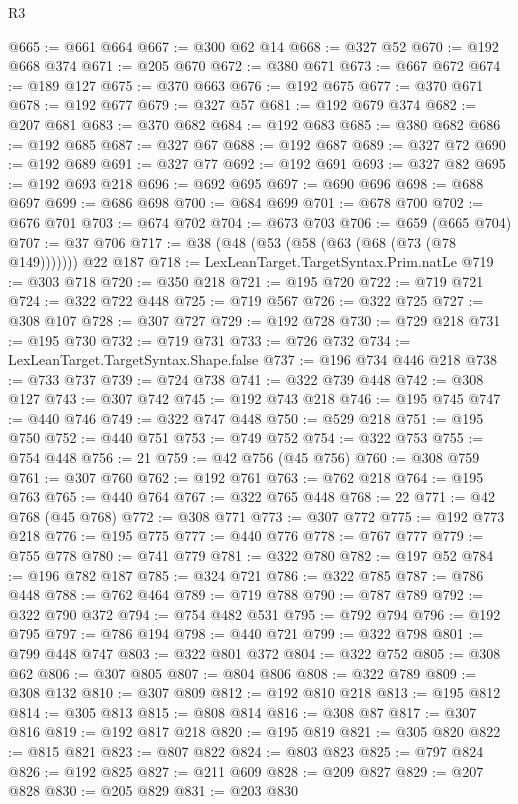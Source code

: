 \begin{lexlean}{R3}
\begin{coremodule}
@665 := @661 @664
@667 := @300 @62 @14
@668 := @327 @52
@670 := @192 @668 @374
@671 := @205 @670
@672 := @380 @671
@673 := @667 @672
@674 := @189 @127
@675 := @370 @663
@676 := @192 @675
@677 := @370 @671
@678 := @192 @677
@679 := @327 @57
@681 := @192 @679 @374
@682 := @207 @681
@683 := @370 @682
@684 := @192 @683
@685 := @380 @682
@686 := @192 @685
@687 := @327 @67
@688 := @192 @687
@689 := @327 @72
@690 := @192 @689
@691 := @327 @77
@692 := @192 @691
@693 := @327 @82
@695 := @192 @693 @218
@696 := @692 @695
@697 := @690 @696
@698 := @688 @697
@699 := @686 @698
@700 := @684 @699
@701 := @678 @700
@702 := @676 @701
@703 := @674 @702
@704 := @673 @703
@706 := @659 (@665 @704)
@707 := @37 @706
@717 := @38 (@48 (@53 (@58 (@63 (@68 (@73 (@78 @149))))))) @22 @187
@718 := LexLeanTarget.TargetSyntax.Prim.natLe
@719 := @303 @718
@720 := @350 @218
@721 := @195 @720
@722 := @719 @721
@724 := @322 @722 @448
@725 := @719 @567
@726 := @322 @725
@727 := @308 @107
@728 := @307 @727
@729 := @192 @728
@730 := @729 @218
@731 := @195 @730
@732 := @719 @731
@733 := @726 @732
@734 := LexLeanTarget.TargetSyntax.Shape.false
@737 := @196 @734 @446 @218
@738 := @733 @737
@739 := @724 @738
@741 := @322 @739 @448
@742 := @308 @127
@743 := @307 @742
@745 := @192 @743 @218
@746 := @195 @745
@747 := @440 @746
@749 := @322 @747 @448
@750 := @529 @218
@751 := @195 @750
@752 := @440 @751
@753 := @749 @752
@754 := @322 @753
@755 := @754 @448
@756 := 21
@759 := @42 @756 (@45 @756)
@760 := @308 @759
@761 := @307 @760
@762 := @192 @761
@763 := @762 @218
@764 := @195 @763
@765 := @440 @764
@767 := @322 @765 @448
@768 := 22
@771 := @42 @768 (@45 @768)
@772 := @308 @771
@773 := @307 @772
@775 := @192 @773 @218
@776 := @195 @775
@777 := @440 @776
@778 := @767 @777
@779 := @755 @778
@780 := @741 @779
@781 := @322 @780
@782 := @197 @52
@784 := @196 @782 @187
@785 := @324 @721
@786 := @322 @785
@787 := @786 @448
@788 := @762 @464
@789 := @719 @788
@790 := @787 @789
@792 := @322 @790 @372
@794 := @754 @482 @531
@795 := @792 @794
@796 := @192 @795
@797 := @786 @194
@798 := @440 @721
@799 := @322 @798
@801 := @799 @448 @747
@803 := @322 @801 @372
@804 := @322 @752
@805 := @308 @62
@806 := @307 @805
@807 := @804 @806
@808 := @322 @789
@809 := @308 @132
@810 := @307 @809
@812 := @192 @810 @218
@813 := @195 @812
@814 := @305 @813
@815 := @808 @814
@816 := @308 @87
@817 := @307 @816
@819 := @192 @817 @218
@820 := @195 @819
@821 := @305 @820
@822 := @815 @821
@823 := @807 @822
@824 := @803 @823
@825 := @797 @824
@826 := @192 @825
@827 := @211 @609
@828 := @209 @827
@829 := @207 @828
@830 := @205 @829
@831 := @203 @830

\end{coremodule}
\end{lexlean}
